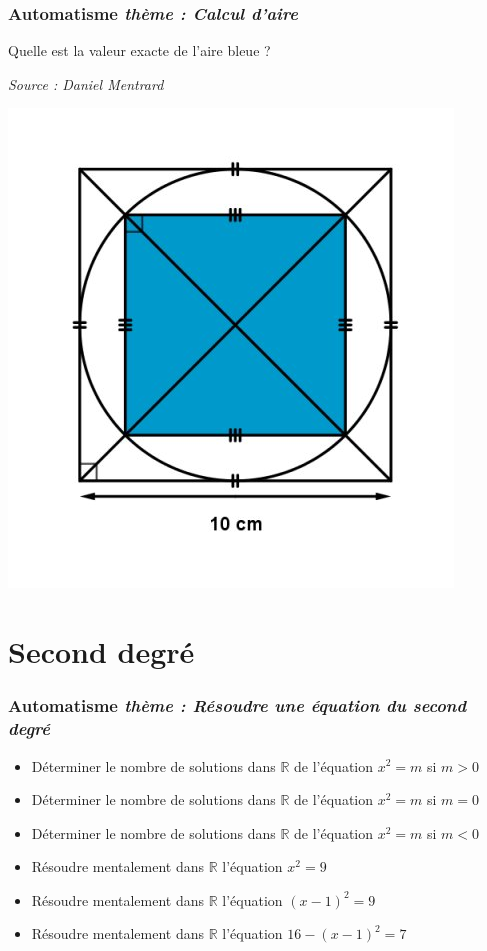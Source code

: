 \documentclass[11pt]{beamer}
\newcommand{\R}{\mathbb{R}}
\newcounter{autocompteur}
\newcommand{\automatisme}[1]{\addtocounter{autocompteur}{1}\frametitle{Automatisme  \theautocompteur  \textit{ thème : #1}}}
\begin{document}
\begin{frame}
\automatisme{Calcul d'aire}
Quelle est la valeur exacte de l'aire bleue ?

{\small \textit{Source : Daniel Mentrard}}

\begin{center}
\includegraphics[scale=0.25]{ressources/blue_area_2023-02-28.jpeg}
\end{center}

\end{frame}


\section{Second degré}


\begin{frame}
\automatisme{Résoudre une équation du second degré}


\begin{itemize}
\item Déterminer le nombre de solutions dans $\R$ de l'équation  $x^{2}=m$ si $m>0$
\item Déterminer le nombre de solutions dans $\R$ de l'équation  $x^{2}=m$ si $m=0$
\item Déterminer le nombre de solutions dans $\R$ de l'équation  $x^{2}=m$ si $m<0$
\item Résoudre mentalement dans $\R$ l'équation $x^{2}=9$
\item Résoudre mentalement dans $\R$ l'équation $(x-1)^{2}=9$
\item Résoudre mentalement dans $\R$ l'équation $16-(x-1)^{2}=7$
\end{itemize}

\end{frame}
\end{document}
